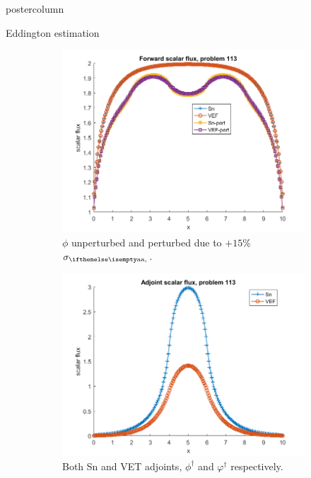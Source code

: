 \documentclass[xcolor={usenames,dvipsnames,svgnames,table}]{beamer}
\begin{document}
\begin{frame}
\begin{columns}
\begin{column}{.33\textwidth}
\begin{beamercolorbox}[center,wd=\textwidth]{postercolumn}
\begin{minipage}[T]{0.95\textwidth}
{\begin{block}{Eddington estimation}
\begin{figure}[H]
\label{Case113syst}
\centering
\begin{subfigure}{.33\textwidth}
  \centering
  \includegraphics[width=.98\linewidth]{113phi.png}
  \caption{$\phi$ unperturbed and perturbed due to $+15\%$ $\siga$.}
  \label{fig:sfig1}
\end{subfigure}
\begin{subfigure}{.33\textwidth}
  \centering
  \includegraphics[width=.98\linewidth]{113phia.png}
    \caption{Both Sn and VET adjoints, $\phi^\dag$ and $\varphi^\dag$ respectively.}
  \label{fig:sfig2}
\end{subfigure}%
\begin{subfigure}{.33\textwidth}
  \centering

\end{subfigure}
\end{figure}
\end{block}}
\end{minipage}
\end{beamercolorbox}
\end{column}
\end{columns}
\end{frame}
\end{document}
